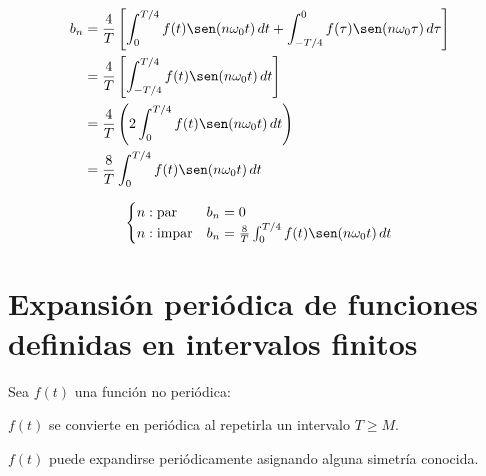 \begin{equation*}
\begin{split}
    b_n
        &=\frac{4}{T}\left[
            \int_0^{T/4} f(t)\sen(n\omega_0 t)\,dt+
            \int_{-T/4}^0 f(\tau)\sen(n\omega_0\tau)\,d\tau
        \right]\\
        &=\frac{4}{T}\left[\int_{-T/4}^{T/4} f(t)\sen(n\omega_0 t)\,dt\right]\\
        &=\frac{4}{T}\left(2\int_0^{T/4} f(t)\sen(n\omega_0 t)\,dt\right)\\
        &=\frac{8}{T}\int_0^{T/4} f(t)\sen(n\omega_0 t)\,dt\\
\end{split}
\end{equation*}

\begin{equation}
\begin{cases}
    n: \text{par}   &b_n=0\\
    n: \text{impar} &b_n=\frac{8}{T}\int_0^{T/4}f(t)\sen(n\omega_0 t)\,dt\\
\end{cases}
\end{equation}

\section{Expansión periódica de funciones definidas en intervalos finitos}
Sea $f(t)$ una función no periódica:

\begin{figure}[H]
    \centering
    
\end{figure}

$f(t)$ se convierte en periódica al repetirla un intervalo $T\geq M$.

\begin{figure}[H]
    \centering
    
\end{figure}

$f(t)$ puede expandirse periódicamente asignando alguna simetría conocida.


